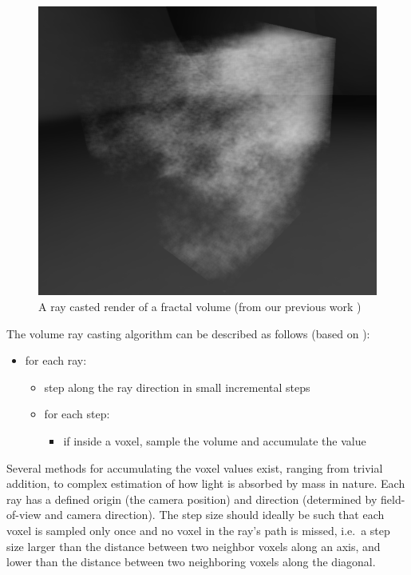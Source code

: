 		
	\begin{figure}[h]
	\centering
	\includegraphics[height=0.35\textheight]{graphics/ray_casting.png}
	\caption[Ray casted render of fractal volume]{A ray casted render of a fractal volume (from our previous work \cite{ludvigsen2010})}
	\label{fig:ray_casting}
	\end{figure}
	
	The volume ray casting algorithm can be described as follows (based on \cite{preim2007}):
	
	\begin{itemize}
		\item for each ray:
		\begin{itemize}
			\item step along the ray direction in small incremental steps
			\item for each step:
			\begin{itemize}
				\item if inside a voxel, sample the volume and accumulate the value
			\end{itemize}
		\end{itemize}
	\end{itemize}
	
	Several methods for accumulating the voxel values exist, ranging from trivial addition, to complex estimation of how light is absorbed by mass in nature. Each ray has a defined origin (the camera position) and direction (determined by field-of-view and camera direction). The step size should ideally be such that each voxel is sampled only once and no voxel in the ray's path is missed, i.e.\ a step size larger than the distance between two neighbor voxels along an axis, and lower than the distance between two neighboring voxels along the diagonal.